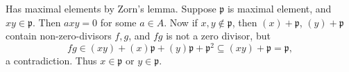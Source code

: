 Has maximal elements by Zorn's lemma. Suppose $\mathfrak p$ is maximal element, and $xy\in\mathfrak p$. Then $axy=0$ for some $a\in A$. Now if $x,y\notin\mathfrak p$, then $(x)+\mathfrak p$, $(y)+\mathfrak p$ contain non-zero-divisors $f,g$, and $fg$ is not a zero divisor, but
\[
fg\in(xy)+(x)\mathfrak p+(y)\mathfrak p+\mathfrak p^2\subseteq(xy)+\mathfrak p=\mathfrak p,
\]
a contradiction. Thus $x\in\mathfrak p$ or $y\in\mathfrak p$.
